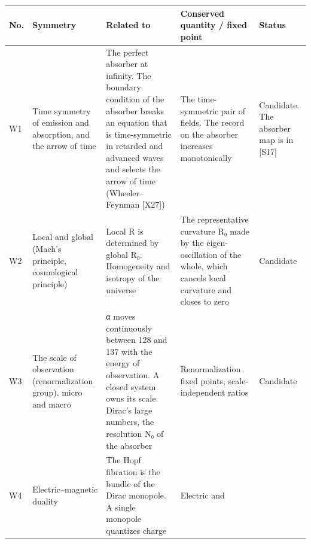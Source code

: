 \documentclass[
  a4paper,
]{article}
\newcounter{none} %
\begin{document}
{\def\LTcaptype{none} %
\begin{longtable}[]{@{}
  >{\raggedright\arraybackslash}p{}
  >{\raggedright\arraybackslash}p{}
  >{\raggedright\arraybackslash}p{}
  >{\raggedright\arraybackslash}p{}
  >{\raggedright\arraybackslash}p{}@{}}
\toprule\noalign{}
\begin{minipage}[b]{\linewidth}\raggedright
No.
\end{minipage} & \begin{minipage}[b]{\linewidth}\raggedright
Symmetry
\end{minipage} & \begin{minipage}[b]{\linewidth}\raggedright
Related to
\end{minipage} & \begin{minipage}[b]{\linewidth}\raggedright
Conserved quantity / fixed point
\end{minipage} & \begin{minipage}[b]{\linewidth}\raggedright
Status
\end{minipage} \\
\midrule\noalign{}
\endhead
\bottomrule\noalign{}
\endlastfoot
W1 & Time symmetry of emission and absorption, and the arrow of time &
The perfect absorber at infinity. The boundary condition of the absorber
breaks an equation that is time-symmetric in retarded and advanced waves
and selects the arrow of time (Wheeler--Feynman {[}X27{]}) & The
time-symmetric pair of fields. The record on the absorber increases
monotonically & Candidate. The absorber map is in {[}S17{]} \\
W2 & Local and global (Mach's principle, cosmological principle) & Local
R is determined by global R₀. Homogeneity and isotropy of the universe &
The representative curvature R₀ made by the eigen-oscillation of the
whole, which cancels local curvature and closes to zero & Candidate \\
W3 & The scale of observation (renormalization group), micro and macro &
α moves continuously between 128 and 137 with the energy of observation.
A closed system owns its scale. Dirac's large numbers, the resolution N₀
of the absorber & Renormalization fixed points, scale-independent ratios
& Candidate \\
W4 & Electric--magnetic duality & The Hopf fibration is the bundle of
the Dirac monopole. A single monopole quantizes charge & Electric and

\end{longtable}}
\end{document}
